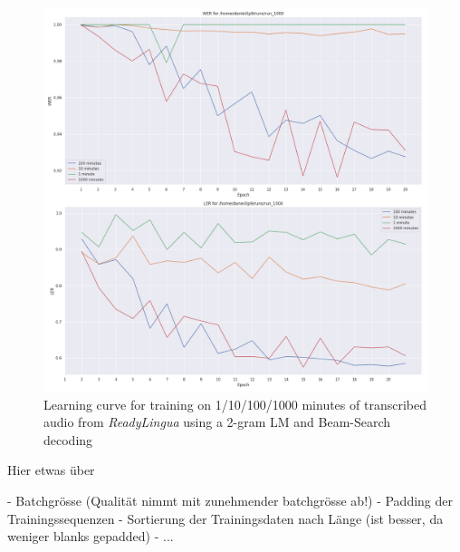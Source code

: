 \begin{figure}
	\includegraphics[width=\linewidth]{./img/learning_curve_lm_beamsearch.png}
	\caption{Learning curve for training on 1/10/100/1000 minutes of transcribed audio from \textit{ReadyLingua} using a 2-gram \ac{LM} and Beam-Search decoding}
	\label{learning_curve_with_lm}
\end{figure}

Hier etwas über

- Batchgrösse (Qualität nimmt mit zunehmender batchgrösse ab!)
- Padding der Trainingssequenzen
- Sortierung der Trainingsdaten nach Länge (ist besser, da weniger blanks gepadded)
- ...

